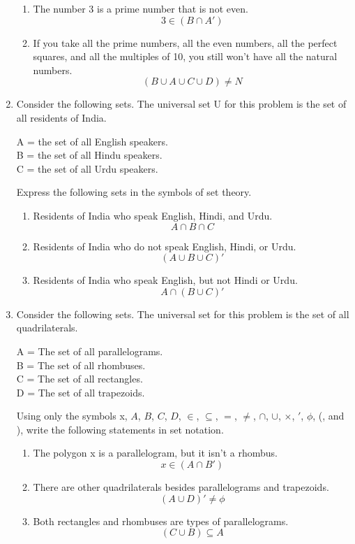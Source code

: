 \documentclass[12pt]{article}
\begin{document}
\begin{enumerate}
\begin{enumerate}
    \item The number 3 is a prime number that is not even.
      \[3 \in (B \cap A')\]
    \item If you take all the prime numbers, all the even numbers, all the perfect squares, and all the multiples of 10, you still won’t have all the natural numbers.
      \[(B \cup A \cup C \cup D) \neq N\]
  \end{enumerate}
  \item Consider the following sets. The universal set U for this problem is the set of all residents of India.
  \begin{center}
    A = the set of all English speakers.\\
    B = the set of all Hindu speakers.\\
    C = the set of all Urdu speakers.\\
  \end{center}
  Express the following sets in the symbols of set theory.
  \begin{enumerate}
    \item Residents of India who speak English, Hindi, and Urdu.
      \[A \cap B \cap C\]
    \item Residents of India who do not speak English, Hindi, or Urdu.
      \[(A \cup B \cup C)'\]
    \item Residents of India who speak English, but not Hindi or Urdu.
      \[A \cap (B \cup C)'\]
  \end{enumerate}

  \newpage 
  \item Consider the following sets. The universal set for this problem is the set of all quadrilaterals.
  \begin{center}
    A = The set of all parallelograms.\\
    B = The set of all rhombuses.\\
    C = The set of all rectangles.\\
    D = The set of all trapezoids.\\
  \end{center}
  Using only the symbols x, $A$, $B$, $C$, $D$, $\in$, $\subseteq$, $=$, $\neq$, $\cap$, $\cup$, $\times$, $'$, $\phi$, (, and ), write the following statements in set notation.
  \begin{enumerate}
    \item The polygon x is a parallelogram, but it isn’t a rhombus.
      \[x \in (A \cap B')\]
    \item There are other quadrilaterals besides parallelograms and trapezoids.
      \[(A \cup D)' \neq \phi\]
    \item Both rectangles and rhombuses are types of parallelograms.
      \[(C \cup B) \subseteq A\]
  \end{enumerate}
  

\end{enumerate}
\end{document}
